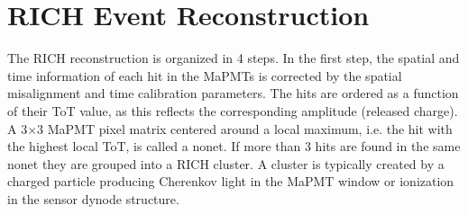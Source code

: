 \documentclass[5p,times,twocolumn]{elsarticle}
\begin{document}
\section{RICH Event Reconstruction}
\label{sec:RICHReco}

The RICH reconstruction is organized in 4 steps.
In the first step, the spatial and time information of each hit in the MaPMTs is corrected by the spatial misalignment
and time calibration parameters. The hits are ordered as a function of their ToT value, as this reflects the
corresponding amplitude (released charge). A 3$\times$3 MaPMT pixel matrix centered around a local maximum, i.e.
the hit with the highest local ToT, is called a nonet. If more than 3 hits are found in the same nonet they are grouped
into a RICH cluster. A cluster is typically created by a charged particle producing Cherenkov light in the MaPMT
window or ionization in the sensor dynode structure. 
\end{document}
